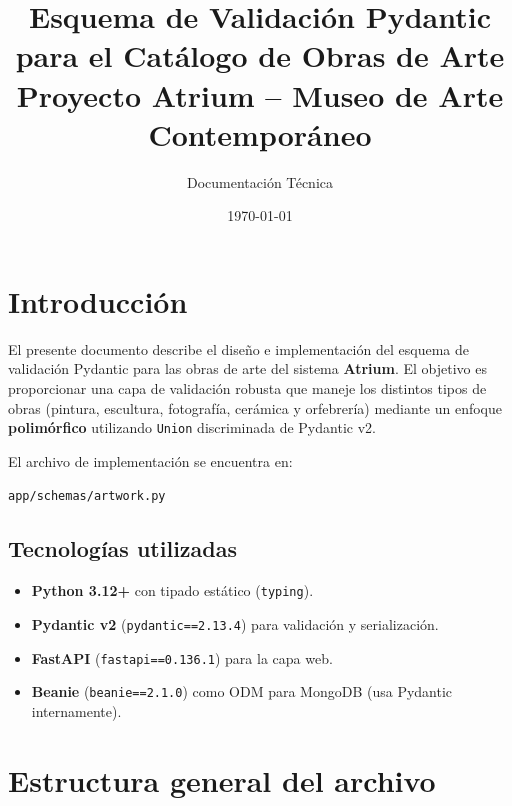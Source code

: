 \documentclass[12pt,a4paper]{article}
\title{\textbf{Esquema de Validación Pydantic}\\para el Catálogo de Obras de Arte\\\large Proyecto Atrium -- Museo de Arte Contemporáneo}
\author{Documentación Técnica}
\date{\today}
\begin{document}
\maketitle
\thispagestyle{empty}
\newpage

\tableofcontents
\newpage

\section{Introducción}

El presente documento describe el diseño e implementación del esquema de validación
Pydantic para las obras de arte del sistema \textbf{Atrium}. El objetivo es
proporcionar una capa de validación robusta que maneje los distintos tipos de obras
(pintura, escultura, fotografía, cerámica y orfebrería) mediante un enfoque
\textbf{polimórfico} utilizando \texttt{Union} discriminada de Pydantic v2.

El archivo de implementación se encuentra en:
\begin{center}
\verb|app/schemas/artwork.py|
\end{center}

\subsection{Tecnologías utilizadas}

\begin{itemize}
    \item \textbf{Python 3.12+} con tipado estático (\texttt{typing}).
    \item \textbf{Pydantic v2} (\texttt{pydantic==2.13.4}) para validación y serialización.
    \item \textbf{FastAPI} (\texttt{fastapi==0.136.1}) para la capa web.
    \item \textbf{Beanie} (\texttt{beanie==2.1.0}) como ODM para MongoDB (usa Pydantic internamente).
\end{itemize}

\section{Estructura general del archivo}
\end{document}
